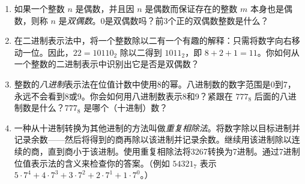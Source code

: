 \begin{enumerate}

  \item 
  
  如果一个整数 $n$ 是偶数，并且因 $n$ 是偶数而保证存在的整数 $m$ 本身也是偶数，则称 $n$ 是\emph{双偶数}。0是双偶数吗？前3个正的双偶数整数是什么？
  \wbvfill
  
  
  \item 
  
  在二进制表示法中，将一个整数除以二有一个有趣的解释：只需将数字向右移动一位。因此，$22 = 10110_2$ 除以二得到 $1011_2$，即 $8+2+1=11$。你如何从一个整数的二进制表示中识别出它是否是双偶数？
  
  \wbvfill
  
  
  \item 
  
  整数的\emph{八进制}表示法在位值计数中使用8的幂。八进制数的数字范围是0到7，永远不会看到8或9。你会如何用八进制数表示8和9？紧跟在 $777_8$ 后面的八进制数是什么？$777_8$ 是哪个（十进制）数？
  
  \wbvfill
  
  \workbookpagebreak
  
  
  \hintspagebreak
  
  \item 
  
  一种从十进制转换为其他进制的方法叫做\emph{重复相除法}。将数字除以目标进制并记录余数——然后将得到的商再除以该进制并记录余数。继续用该进制除以连续的商，直到商小于该进制。使用重复相除法将3267转换为7进制。通过7进制位值表示法的含义来检查你的答案。（例如 $54321_7$ 表示 $5\cdot7^4 + 4\cdot7^3 + 3 \cdot7^2 + 2\cdot7^1 + 1\cdot7^0$。）
  
  \wbvfill
  
  \hint{
  
  \[ 3267 \; = \; 466 \cdot 7 + 5 \]
  
  \[ 466 \; = \; 66 \cdot 7 + 4 \]
  
}
\end{enumerate}
